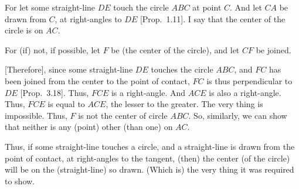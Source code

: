 \begin{Parallel}{}{}
{For let some straight-line $DE$  touch the circle $ABC$  at point $C$. And let $CA$
be drawn from $C$, at right-angles to $DE$ [Prop.~1.11]. I say that the center of the circle is on $AC$.

For (if) not, if possible, let $F$ be (the center of the circle), and let
$CF$ be joined.

\mbox{[}Therefore], since some straight-line $DE$ touches the circle $ABC$, and
$FC$ has been joined from the center to the point of contact, $FC$ is thus
perpendicular to $DE$ [Prop.~3.18]. Thus, $FCE$ is a right-angle.
And $ACE$ is also a right-angle. Thus, $FCE$ is equal to $ACE$, the lesser to the
greater. The very thing is impossible. Thus, $F$ is not the center of circle $ABC$. 
So, similarly, we can show that neither is any (point) other (than one) on $AC$.

Thus, if some straight-line touches a circle, and a straight-line is drawn from the
point of contact, at
right-angles to the tangent, (then) the center (of the circle) will be on the (straight-line) so drawn. (Which is) the very thing it was required to show.}
\end{Parallel}

